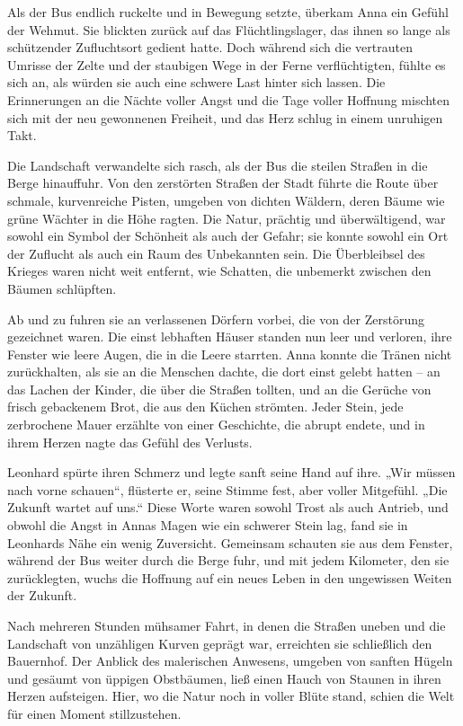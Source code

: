\documentclass[
]{article}
\begin{document}
Als der Bus endlich ruckelte und in Bewegung setzte, überkam Anna ein
Gefühl der Wehmut. Sie blickten zurück auf das Flüchtlingslager, das
ihnen so lange als schützender Zufluchtsort gedient hatte. Doch während
sich die vertrauten Umrisse der Zelte und der staubigen Wege in der
Ferne verflüchtigten, fühlte es sich an, als würden sie auch eine
schwere Last hinter sich lassen. Die Erinnerungen an die Nächte voller
Angst und die Tage voller Hoffnung mischten sich mit der neu gewonnenen
Freiheit, und das Herz schlug in einem unruhigen Takt.

Die Landschaft verwandelte sich rasch, als der Bus die steilen Straßen
in die Berge hinauffuhr. Von den zerstörten Straßen der Stadt führte die
Route über schmale, kurvenreiche Pisten, umgeben von dichten Wäldern,
deren Bäume wie grüne Wächter in die Höhe ragten. Die Natur, prächtig
und überwältigend, war sowohl ein Symbol der Schönheit als auch der
Gefahr; sie konnte sowohl ein Ort der Zuflucht als auch ein Raum des
Unbekannten sein. Die Überbleibsel des Krieges waren nicht weit
entfernt, wie Schatten, die unbemerkt zwischen den Bäumen schlüpften.

Ab und zu fuhren sie an verlassenen Dörfern vorbei, die von der
Zerstörung gezeichnet waren. Die einst lebhaften Häuser standen nun leer
und verloren, ihre Fenster wie leere Augen, die in die Leere starrten.
Anna konnte die Tränen nicht zurückhalten, als sie an die Menschen
dachte, die dort einst gelebt hatten -- an das Lachen der Kinder, die
über die Straßen tollten, und an die Gerüche von frisch gebackenem Brot,
die aus den Küchen strömten. Jeder Stein, jede zerbrochene Mauer
erzählte von einer Geschichte, die abrupt endete, und in ihrem Herzen
nagte das Gefühl des Verlusts.

Leonhard spürte ihren Schmerz und legte sanft seine Hand auf ihre. „Wir
müssen nach vorne schauen``, flüsterte er, seine Stimme fest, aber
voller Mitgefühl. „Die Zukunft wartet auf uns.`` Diese Worte waren
sowohl Trost als auch Antrieb, und obwohl die Angst in Annas Magen wie
ein schwerer Stein lag, fand sie in Leonhards Nähe ein wenig Zuversicht.
Gemeinsam schauten sie aus dem Fenster, während der Bus weiter durch die
Berge fuhr, und mit jedem Kilometer, den sie zurücklegten, wuchs die
Hoffnung auf ein neues Leben in den ungewissen Weiten der Zukunft.

Nach mehreren Stunden mühsamer Fahrt, in denen die Straßen uneben und
die Landschaft von unzähligen Kurven geprägt war, erreichten sie
schließlich den Bauernhof. Der Anblick des malerischen Anwesens, umgeben
von sanften Hügeln und gesäumt von üppigen Obstbäumen, ließ einen Hauch
von Staunen in ihren Herzen aufsteigen. Hier, wo die Natur noch in
voller Blüte stand, schien die Welt für einen Moment stillzustehen.
\end{document}
